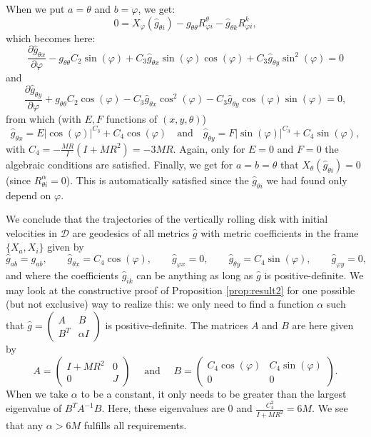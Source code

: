 \documentclass[11pt]{article}
\def\I{I}
\def\J{J}
\def\m{M}
\def\Ra{R}
\def\ct{C_2}
\def\cd{C_3}
\def\cv{C_4}
\begin{document}
When we put $a=\theta$ and $b=\varphi$, we get:
\[
0=X_{\varphi}\left(\hat{g}_{\theta i}\right)-g_{\theta\theta} R_{\varphi i}^\theta-\hat{g}_{\theta k} R_{\varphi i}^k,
\]
which becomes here:
\[
\frac{\partial \hat{g}_{\theta x}}{\partial \varphi}-g_{\theta\theta}\ct\sin (\varphi)+\cd \hat{g}_{\theta x} \sin( \varphi) \cos( \varphi)+\cd {\hat g}_{\theta y} \sin^2( \varphi)=0
\]
and
\[
\frac{\partial \hat{g}_{\theta y}}{\partial \varphi}+g_{\theta\theta}\ct\cos( \varphi)-\cd \hat{g}_{\theta x} \cos^2 (\varphi)-\cd {\hat g}_{\theta y} \cos(\varphi) \sin(\varphi)=0,
\]
from which (with $E,F$ functions of $(x,y,\theta)$)
\[
\hat{g}_{\theta x} =E|\cos (\varphi)|^{\cd}+\cv\cos( \varphi) \quad\mbox{and}\quad 
\hat{g}_{\theta y} = F|\sin (\varphi)|^{\cd}+\cv\sin( \varphi), 
\]
with $\cv = -\frac{\m\Ra}{\I}(\I+\m\Ra^2) = -3MR$.  Again, only for $E=0$ and $F=0$ the algebraic conditions are satisfied.  Finally, we get 
for $a=b=\theta$ that $X_\theta\left(\hat{g}_{\theta i}\right)=0$ (since $R_{\theta i}^\alpha=0$). This is automatically satisfied since the $\hat{g}_{\theta i}$ we had found only depend on $\varphi$.


We conclude that the trajectories of the vertically rolling disk with initial velocities in $\mathcal{D}$ are geodesics of all metrics $\hat{g}$ with metric coefficients in the frame $\{X_a,X_i\}$ given by 
$$
\hat{g}_{ab}=g_{ab},\quad\quad \hat{g}_{\theta x}=\cv \cos (\varphi), \quad \quad \hat{g}_{\varphi x}=0, \quad\quad \hat{g}_{\theta y}=\cv \sin( \varphi), \quad \quad\hat{g}_{\varphi y}=0,
$$
 and where the coefficients $\hat{g}_{ik}$ can be anything as long as $\hat{g}$ is positive-definite. 
We may look at the constructive proof of Proposition \ref{prop:result2} for one possible (but not exclusive) way  to realize this: we only need to find a function $\alpha$ such that $\hat{g}=\begin{pmatrix}
    A&B\\B^T&\alpha I
\end{pmatrix}$ is positive-definite. The matrices $A$ and $B$ are here given by 
$$A=\begin{pmatrix}
    \I+\m\Ra^2&0\\0&\J
\end{pmatrix}\quad\text{ and }\quad B=\begin{pmatrix}
    \cv\cos(\varphi)&\cv\sin(\varphi)\\0&0
\end{pmatrix}.
$$
 When we take  $\alpha$ to be a constant, it only needs to be greater than the  largest eigenvalue of $B^TA^{-1}B$. Here, these eigenvalues are $0$ and $\frac{\cv^2}{I+\m\Ra^2}= 6M$. We see that any $\alpha>6M$ fulfills all requirements.
\end{document}

